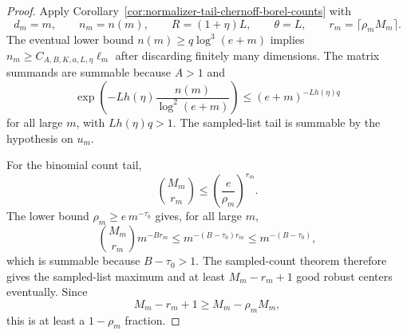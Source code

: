 \documentclass[11pt]{amsart}
\numberwithin{equation}{section}
\theoremstyle{definition}
\theoremstyle{remark}
\begin{document}
\begin{proof}
Apply Corollary~\ref{cor:normalizer-tail-chernoff-borel-counts} with
\[
  d_m=m,\qquad n_m=n(m),\qquad
  R=(1+\eta)L,\qquad \theta=L,\qquad
  r_m=\lceil\rho_mM_m\rceil .
\]
The eventual lower bound \(n(m)\ge q\log^3(e+m)\) implies
\(n_m\ge C_{A,B,K,a,L,\eta}\ell_m\) after discarding finitely many dimensions.
The matrix summands are summable because \(A>1\) and
\[
  \exp\left(-Lh(\eta)\frac{n(m)}{\log^2(e+m)}\right)
  \le (e+m)^{-Lh(\eta)q}
\]
for all large \(m\), with \(Lh(\eta)q>1\).  The sampled-list tail is summable by
the hypothesis on \(u_m\).

For the binomial count tail,
\[
  \binom{M_m}{r_m}
  \le \left(\frac e{\rho_m}\right)^{r_m}.
\]
The lower bound \(\rho_m\ge e\,m^{-\tau_0}\) gives, for all large \(m\),
\[
  \binom{M_m}{r_m}m^{-B r_m}
  \le m^{-(B-\tau_0)r_m}\le m^{-(B-\tau_0)},
\]
which is summable because \(B-\tau_0>1\).  The sampled-count theorem therefore gives
the sampled-list maximum and at least \(M_m-r_m+1\) good robust centers
eventually.  Since
\[
  M_m-r_m+1\ge M_m-\rho_mM_m,
\]
this is at least a \(1-\rho_m\) fraction.
\end{proof}
\end{document}
